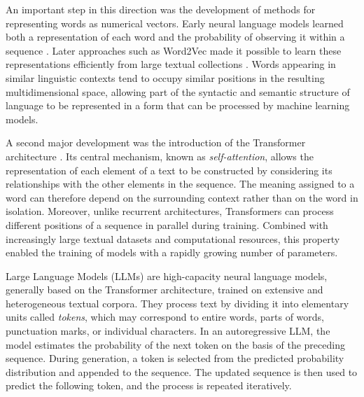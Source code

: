 An important step in this direction was the development of methods for representing words as numerical vectors. Early neural language models learned both a representation of each word and the probability of observing it within a sequence \citep{bengio_neural_2003}. Later approaches such as Word2Vec made it possible to learn these representations efficiently from large textual collections \citep{mikolov_efficient_2013}. Words appearing in similar linguistic contexts tend to occupy similar positions in the resulting multidimensional space, allowing part of the syntactic and semantic structure of language to be represented in a form that can be processed by machine learning models.

A second major development was the introduction of the Transformer architecture \citep{vaswani_attention_2017}. Its central mechanism, known as \textit{self-attention}, allows the representation of each element of a text to be constructed by considering its relationships with the other elements in the sequence. The meaning assigned to a word can therefore depend on the surrounding context rather than on the word in isolation. Moreover, unlike recurrent architectures, Transformers can process different positions of a sequence in parallel during training. Combined with increasingly large textual datasets and computational resources, this property enabled the training of models with a rapidly growing number of parameters.

Large Language Models (LLMs) are high-capacity neural language models, generally based on the Transformer architecture, trained on extensive and heterogeneous textual corpora. They process text by dividing it into elementary units called \textit{tokens}, which may correspond to entire words, parts of words, punctuation marks, or individual characters. In an autoregressive LLM, the model estimates the probability of the next token on the basis of the preceding sequence. During generation, a token is selected from the predicted probability distribution and appended to the sequence. The updated sequence is then used to predict the following token, and the process is repeated iteratively. 

